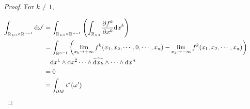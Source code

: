 \begin{proof}
    For  $ k\neq 1 $, 
    
    \begin{equation*}
        \begin{aligned}
            \int_{\mathbb R_{\leq 0}\times \mathbb R^{n-1}}\mathrm{d} \omega'&=\int_{\mathbb R_{\leq 0}\times \mathbb R^{n-1}}\left(\int_{\mathbb R_{\leq 0}}\frac{\partial f^k}{\partial x^k}\mathrm{d} x^k\right)\\
            &=\int_{\mathbb R^{n-1}}\left(\displaystyle\lim_{x_k\to+\infty}f^k(x_1,x_2,\cdots,0,\cdots,x_n)-\displaystyle\lim_{x_k\to-\infty}f^k(x_1,x_2,\cdots,x_n)\right)\\
            &\quad\mathrm{d} x^1\wedge\mathrm{d} x^2\cdots\wedge\widehat{\mathrm{d} x_k}\wedge\cdots\wedge \mathrm{d} x^n\\
            &=0\\
            &=\int_{\partial M}\iota^*(\omega')
        \end{aligned}
    \end{equation*}
\end{proof}
